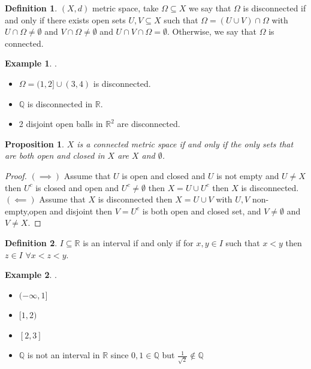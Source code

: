 \documentclass[11pt,openany]{book}
\theoremstyle{plain}
\newtheorem{proposition}{Proposition}[chapter]
\theoremstyle{definition}
\newtheorem{definition}{Definition}[chapter]
\newtheorem{example}{Example}[chapter]
\theoremstyle{remark}
\newcommand{\R}{\mathbb{R}}
\newcommand{\Q}{\mathbb{Q}}
\newcommand{\Om}{\Omega}
\begin{document}
\begin{definition}
    $(X,d)$ metric space, take $\Omega \subseteq X$ we say that $\Omega$ is disconnected if and only if there exists open sets $U,V \subseteq X$ such that $\Omega = (U \cup  V) \cap \Omega$ with $U \cap \Omega \ne \emptyset$ and $V \cap \Omega \ne \emptyset$ and $U\cap V\cap \Omega=\emptyset$. Otherwise, we say that $\Omega$ is connected.
\end{definition}

\begin{example}.
    \begin{itemize}
        \item  $\Om = (1,2] \cup (3,4)$ is disconnected.
        \item $\Q$ is disconnected in $\R$.
        \item 2 disjoint open balls in $\R^2$ are disconnected.
    \end{itemize}
\end{example}

\begin{proposition}
    $X$ is a connected metric space if and only if the only sets that are both open and closed in $X$ are $X$ and $\emptyset$.
\end{proposition}
\begin{proof}
    $(\implies)$ Assume that $U$ is open and closed and $U$ is not empty and $U \ne X$ then $U^c$ is closed and open and $U^c \ne \emptyset$ then $X = U \cup U^c$ then $X$ is disconnected.
    \\
    $(\impliedby)$ Assume that $X$ is disconnected then $X = U \cup V$ with $U,V$ non-empty,open and disjoint  then $V = U^c$ is both open and closed set, and $V \ne \emptyset$ and $V \ne X$.
\end{proof}

\begin{definition}
    $I \subseteq \R$ is an interval if and only if for $x,y \in I$ such that $x <y$ then $z \in I$ $\forall x < z<y$.
\end{definition}

\begin{example}.
    \begin{itemize}
        \item $(-\infty, 1]$
        \item $[1,2)$
        \item $[2,3]$
        \item $\Q$ is not an interval in $\R$ since $0,1 \in \Q$ but $\frac{1}{\sqrt{2}} \notin \Q$
    \end{itemize}
\end{example}
\end{document}
